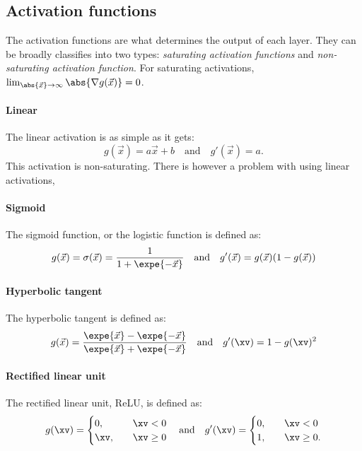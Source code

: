    \subsection{Activation functions}
        The activation functions are what determines the output of each layer. They can be broadly classifies into two types: \textit{saturating activation functions} and \textit{non-saturating activation function}. For saturating activations, $\lim_{\abs{\vec{x}}\to\infty}\abs{\nabla g(\vec{x})} = 0$. 
        \paragraph{Linear}
            The linear activation is as simple as it gets:
            \begin{equation}
                g(\vec{x}) = a\vec{x} + b \quad \mathrm{and} \quad g'(\vec{x}) = a.
            \end{equation}
            This activation is non-saturating. There is however a problem with using linear activations, 

        \paragraph{Sigmoid}
            The sigmoid function, or the logistic function is defined as: 
            \begin{equation}
                g(\vec{x}) = \sigma(\vec{x}) = \frac{1}{1+\expe{-\vec{x}}} \quad \mathrm{and} \quad g'(\vec{x}) = g(\vec{x})(1-g(\vec{x}))
            \end{equation}


        \paragraph{Hyperbolic tangent}
            The hyperbolic tangent is defined as:
            \begin{equation}
                g(\vec{x}) = \frac{\expe{\vec{x}}-\expe{-\vec{x}}}{\expe{\vec{x}}+\expe{-\vec{x}}} \quad \mathrm{and} \quad g'(\xv)=1-g(\xv)^2
            \end{equation}

        \paragraph{Rectified linear unit}
            The rectified linear unit, ReLU, is defined as:
            \begin{equation}
                g(\xv) = 
                \begin{cases}
                    0, \quad & \xv < 0 \\
                    \xv, \quad & \xv \geq 0
                \end{cases}
                \quad \mathrm{and} \quad
                g'(\xv) = 
                \begin{cases}
                    0, \quad & \xv < 0 \\
                    1, \quad & \xv \geq 0.
                \end{cases}
            \end{equation}

